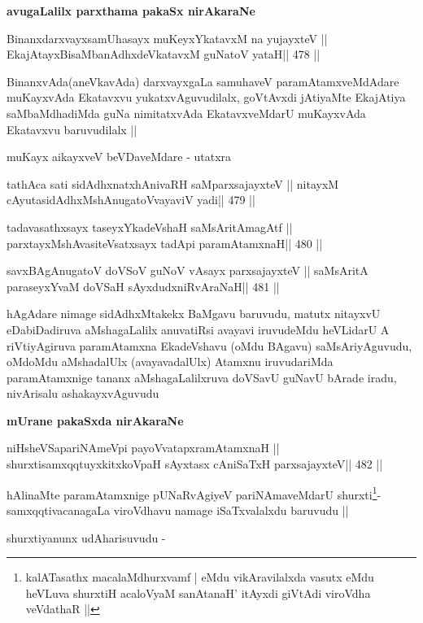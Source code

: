 \medskip
\centerline{\textbf{avugaLalilx parxthama pakaSx nirAkaraNe}}

\begin{shl}
BinanxdarxvayxsamUhasayx muKeyxYkatavxM na yujayxteV ||
EkajAtayxBisaMbanAdhxdeVkatavxM guNatoV yataH\hfill || 478 ||
\end{shl}

\begin{artha}
BinanxvAda(aneVkavAda) darxvayxgaLa samuhaveV paramAtamxveMdAdare
muKayxvAda Ekatavxvu yukatxvAguvudilalx, goVtAvxdi jAtiyaMte EkajAtiya
saMbaMdhadiMda guNa nimitatxvAda EkatavxveMdarU muKayxvAda Ekatavxvu
baruvudilalx ||

muKayx aikayxveV beVDaveMdare - utatxra
\end{artha}

\begin{shl}
tathAca sati sidAdhxnatxhAnivaRH saMparxsajayxteV ||
nitayxM cAyutasidAdhxMshAnugatoV\s vayaviV yadi\hfill || 479 ||
\end{shl}

\begin{shl}
tadavasathxsayx taseyxYkadeVshaH saMsAritAmagAtf ||
parxtayxMshAvasiteVsatxsayx tadA\s pi paramAtamxnaH\hfill || 480 ||
\end{shl}

\begin{shl}
savxBAgAnugatoV doVSoV guNoV vA\s sayx parxsajayxteV ||
saMsAritA paraseyxYvaM doVSaH sAyxdudxniRvAraNaH\hfill || 481 ||
\end{shl}

\begin{artha}
hAgAdare nimage sidAdhxMtakekx BaMgavu baruvudu, matutx nitayxvU
eDabiDadiruva aMshagaLalilx anuvatiRsi avayavi iruvudeMdu heVLidarU A
riVtiyAgiruva paramAtamxna EkadeVshavu (oMdu BAgavu) saMsAriyAguvudu,
oMdoMdu aMshadalUlx (avayavadalUlx) Atamxnu iruvudariMda
paramAtamxnige tananx aMshagaLalilxruva doVSavU guNavU bArade iradu,
nivArisalu ashakayxvAguvudu
\end{artha}

\medskip
\centerline{\textbf{mUrane pakaSxda nirAkaraNe}}

\begin{shl}
niHsheVSapariNAmeV\s pi payoVvatapxramAtamxnaH ||
shurxtisamxqqtuyxkitxkoVpaH sAyxtasx cAniSaTxH parxsajayxteV\hfill || 482 ||
\end{shl}

\begin{artha}
hAlinaMte paramAtamxnige pUNaRvAgiyeV pariNAmaveMdarU
shurxti\footnote{kalATasathx macalaMdhurxvamf | eMdu vikAravilalxda
  vasutx eMdu heVLuva shurxtiH acaloV\s yaM sanAtanaH' itAyxdi giVtAdi
viroVdha veVdathaR ||}-samxqqtivacanagaLa viroVdhavu namage iSaTxvalalxdu
baruvudu ||

shurxtiyanunx udAharisuvudu -
\end{artha}


